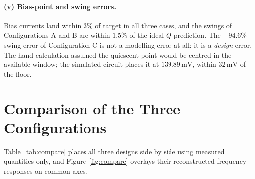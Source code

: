 \documentclass[12pt,a4paper]{article}
\newcommand{\U}[1]{\,\mathrm{#1}}
\begin{document}
\paragraph{(v) Bias-point and swing errors.}
Bias currents land within $3\%$ of target in all three cases, and the swings of
Configurations A and B are within $1.5\%$ of the ideal-$Q$ prediction. The
$-94.6\%$ swing error of Configuration C is not a modelling error at all: it is
a \emph{design} error. The hand calculation assumed the quiescent point would
be centred in the available window; the simulated circuit places it at
$139.89\U{mV}$, within $32\U{mV}$ of the floor.

\section{Comparison of the Three Configurations}
Table~\ref{tab:compare} places all three designs side by side using measured
quantities only, and Figure~\ref{fig:compare} overlays their reconstructed
frequency responses on common axes.
\end{document}
